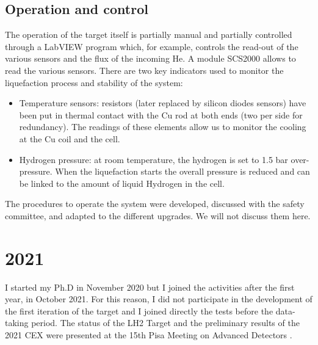 \begin{refsection}
    \subsection{Operation and control}
        The operation of the target itself is partially manual and partially controlled through a LabVIEW program which, for example, controls the read-out of the various sensors and the flux of the incoming He. 
        A module SCS2000 allows to read the various sensors. 
        There are two key indicators used to monitor the liquefaction process and stability of the system:
    
        \begin{itemize}
            \item Temperature sensors: resistors (later replaced by \lakeshore silicon diodes sensors) have been put in thermal contact with the Cu rod at both ends (two per side for redundancy). 
            The readings of these elements allow us to monitor the cooling at the Cu coil and the cell.
            \item Hydrogen pressure: at room temperature, the hydrogen is set to 1.5 bar over-pressure. When the liquefaction starts the overall pressure is reduced and can be linked to the amount of liquid Hydrogen in the cell. 
        \end{itemize}
        \noindent
        The procedures to operate the system were developed, discussed with the safety committee, and adapted to the different upgrades.
        We will not discuss them here.

\section{2021}
    I started my Ph.D in November 2020 but I joined the activities after the first year, in October 2021. 
    For this reason, I did not participate in the development of the first iteration of the target and I joined directly the tests before the data-taking period.
    The status of the LH2 Target and the preliminary results of the 2021 CEX were presented at the 15th Pisa Meeting on Advanced Detectors \cite{Elba:mio}.


\end{refsection}

